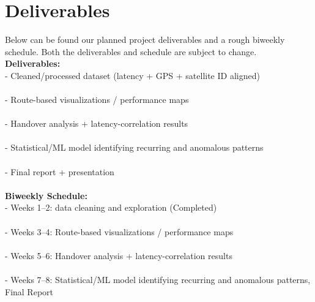 \documentclass{article}
\begin{document}
\section{Deliverables}

Below can be found our planned project deliverables and a rough biweekly schedule. Both the deliverables and schedule are subject to change. \\

\textbf{Deliverables:}\\
  - Cleaned/processed dataset (latency + GPS + satellite ID aligned)\\\\
  - Route-based visualizations / performance maps\\\\
  - Handover analysis + latency-correlation results\\\\
  - Statistical/ML model identifying recurring and anomalous patterns\\\\
  - Final report + presentation\\\\
\textbf{Biweekly Schedule:}\\
    - Weeks 1–2: data cleaning and exploration (Completed)\\\\
    - Weeks 3–4: Route-based visualizations / performance maps\\\\
    - Weeks 5–6: Handover analysis + latency-correlation results\\\\
    - Weeks 7–8: Statistical/ML model identifying recurring and anomalous patterns, Final Report\\\\




 
\end{document}
